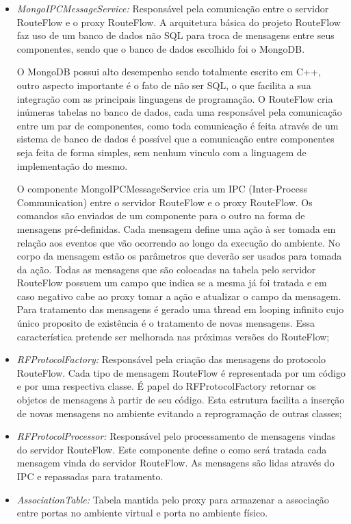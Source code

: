 \begin{itemize}
\item \textit{MongoIPCMessageService:} Responsável pela
 comunicação entre o servidor RouteFlow e o proxy 
RouteFlow. A arquitetura básica do projeto RouteFlow 
faz uso de um banco de dados não SQL para troca de 
mensagens entre seus componentes, sendo que o banco 
de dados escolhido foi o MongoDB. 

O MongoDB possui 
alto desempenho sendo totalmente escrito em C++, outro
 aspecto importante é o fato de não ser SQL, o 
que facilita a sua integração com as  principais linguagens
 de programação. 
O RouteFlow cria inúmeras tabelas no banco de dados, cada uma 
responsável pela comunicação entre um par 
de componentes, como toda comunicação é feita através de um 
sistema de banco de dados é possível que a 
comunicação entre componentes seja feita de forma simples, sem 
nenhum vinculo com a linguagem de 
implementação do mesmo. 

O componente MongoIPCMessageService 
cria um IPC (Inter-Process Communication) 
entre o servidor RouteFlow e o proxy RouteFlow. Os comandos são 
enviados de um componente para o outro 
na forma de mensagens pré-definidas. Cada mensagem define uma 
ação à ser tomada em relação aos eventos 
que vão ocorrendo ao longo da execução do ambiente. No corpo da 
mensagem estão os parâmetros que 
deverão ser usados para tomada da ação. Todas as mensagens que 
são colocadas na tabela pelo servidor RouteFlow 
possuem um campo que indica se a mesma já foi tratada e em caso 
negativo cabe ao proxy tomar a ação e 
atualizar o campo da mensagem. Para tratamento das mensagens é 
gerado uma thread em looping infinito 
cujo único proposito de existência é o tratamento de novas mensagens. 
Essa característica pretende ser melhorada nas próximas versões 
do RouteFlow;
\item \textit{RFProtocolFactory:} Responsável pela criação das 
mensagens do protocolo RouteFlow. Cada 
tipo de mensagem RouteFlow é representada por um código e 
por uma respectiva classe. É papel do 
RFProtocolFactory retornar os objetos de mensagens à partir de 
seu código. Esta estrutura facilita a 
inserção de novas mensagens no ambiente evitando a reprogramação 
de outras classes;
\item \textit{RFProtocolProcessor:} Responsável pelo processamento 
de mensagens vindas do servidor 
RouteFlow. Este componente define o como será tratada cada mensagem 
vinda do servidor RouteFlow. As 
mensagens são lidas através do IPC e repassadas para tratamento.
\item \textit{AssociationTable:} Tabela mantida pelo proxy para armazenar 
a associação entre portas no 
ambiente virtual e porta no ambiente físico.
\end{itemize} 

